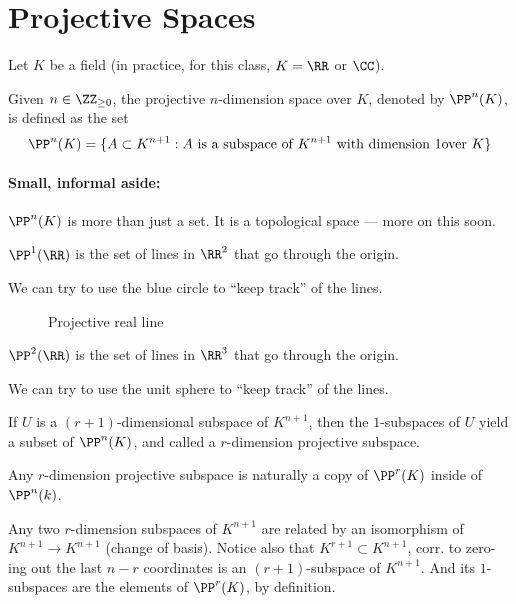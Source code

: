 \newpage
\section{Projective Spaces}

Let $K$ be a field (in practice, for this class, $K = \RR$ or $\CC$).

\begin{thm}
	Given $n \in \ZZ_{\ge 0}$, the projective $n$-dimension space over $K$, denoted by $\PP^n(K)$, is defined as the set \[
		\PP^n(K) = \{A \subset K^{n+1} : A \text{ is a subspace of } K^{n+1} \text{ with dimension }1 \text{over $K$} \}	
	\]
\end{thm}

\paragraph{Small, informal aside:} $\PP^n(K)$ is more than just a set. It is a topological space --- more on this soon.

\begin{exmp}
	$\PP^1(\RR)$ is the set of lines in $\RR^2$ that go through the origin.

	We can try to use the blue circle to ``keep track'' of the lines.
\end{exmp}

\begin{figure}[ht]
    \centering
    \caption{Projective real line}
    \label{fig:projective-real-line}
\end{figure}

\begin{exmp}
	$\PP^2(\RR)$ is the set of lines in $\RR^3$ that go through the origin. 

	We can try to use the unit sphere to ``keep track'' of the lines.
\end{exmp}

\begin{defn}
	If $U$ is a $(r+1)$-dimensional subspace of $K^{n+1}$, then the $1$-subspaces of $U$ yield a subset of $\PP^n(K)$, and called a $r$-dimension projective subspace.
\end{defn}

\begin{prop}
	Any $r$-dimension projective subspace is naturally a copy of $\PP^r(K)$ inside of $\PP^n(k)$.
\end{prop}
\begin{dem}
	Any two $r$-dimension subspaces of $K^{n+1}$ are related by an isomorphism of  $K^{n+1} \to K^{n+1}$ (change of basis). Notice also that  $K^{r+1} \subset K^{n+1}$, corr. to zero-ing out the last  $n-r$ coordinates is an $(r+1)$-subspace of $K^{n+1}$. And its $1$-subspaces are the elements of $\PP^r(K)$, by definition.
\end{dem}

